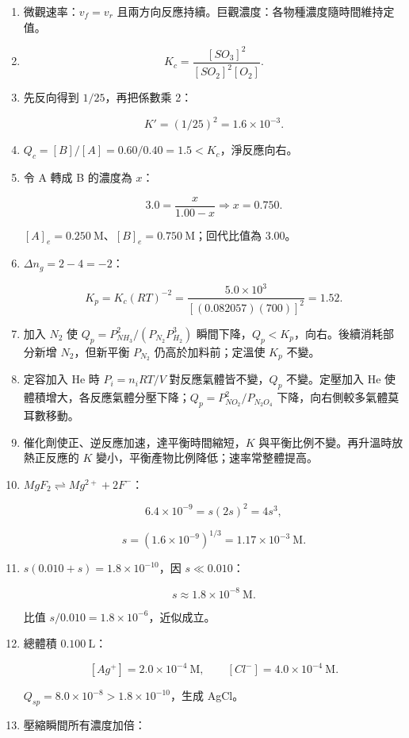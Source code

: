 \documentclass[11pt,a4paper]{article}
\begin{document}
\begin{enumerate}
\def\labelenumi{\arabic{enumi}.}
\item
  微觀速率：\(v_f=v_r\) 且兩方向反應持續。巨觀濃度：各物種濃度隨時間維持定值。
\item
  \[
  K_c=\frac{[SO_3]^2}{[SO_2]^2[O_2]}.
  \]
\item
  先反向得到 \(1/25\)，再把係數乘 2：

  \[
  K'=(1/25)^2=1.6\times10^{-3}.
  \]
\item
  \(Q_c=[B]/[A]=0.60/0.40=1.5<K_c\)，淨反應向右。
\item
  令 A 轉成 B 的濃度為 \(x\)：

  \[
  3.0=\frac{x}{1.00-x}\Rightarrow x=0.750.
  \]

  \([A]_e=0.250\ \mathrm M\)、\([B]_e=0.750\ \mathrm M\)；回代比值為 3.00。
\item
  \(\Delta n_g=2-4=-2\)：

  \[
  K_p=K_c(RT)^{-2}
  =\frac{5.0\times10^3}{[(0.082057)(700)]^2}
  =1.52.
  \]
\item
  加入 \(N_2\) 使 \(Q_p=P_{NH_3}^2/(P_{N_2}P_{H_2}^3)\) 瞬間下降，\(Q_p<K_p\)，向右。後續消耗部分新增 \(N_2\)，但新平衡 \(P_{N_2}\) 仍高於加料前；定溫使 \(K_p\) 不變。
\item
  定容加入 He 時 \(P_i=n_iRT/V\) 對反應氣體皆不變，\(Q_p\) 不變。定壓加入 He 使體積增大，各反應氣體分壓下降；\(Q_p=P_{NO_2}^2/P_{N_2O_4}\) 下降，向右側較多氣體莫耳數移動。
\item
  催化劑使正、逆反應加速，達平衡時間縮短，\(K\) 與平衡比例不變。再升溫時放熱正反應的 \(K\) 變小，平衡產物比例降低；速率常整體提高。
\item
  \(MgF_2\rightleftharpoons Mg^{2+}+2F^-\)：

  \[
  6.4\times10^{-9}=s(2s)^2=4s^3,
  \]

  \[
  s=(1.6\times10^{-9})^{1/3}=1.17\times10^{-3}\ \mathrm M.
  \]
\item
  \(s(0.010+s)=1.8\times10^{-10}\)，因 \(s\ll0.010\)：

  \[
  s\approx1.8\times10^{-8}\ \mathrm M.
  \]

  比值 \(s/0.010=1.8\times10^{-6}\)，近似成立。
\item
  總體積 \(0.100\ \mathrm L\)：

  \[
  [Ag^+]=2.0\times10^{-4}\ \mathrm M,\qquad
  [Cl^-]=4.0\times10^{-4}\ \mathrm M.
  \]

  \(Q_{sp}=8.0\times10^{-8}>1.8\times10^{-10}\)，生成 AgCl。
\item
  壓縮瞬間所有濃度加倍：


\end{enumerate}
\end{document}
